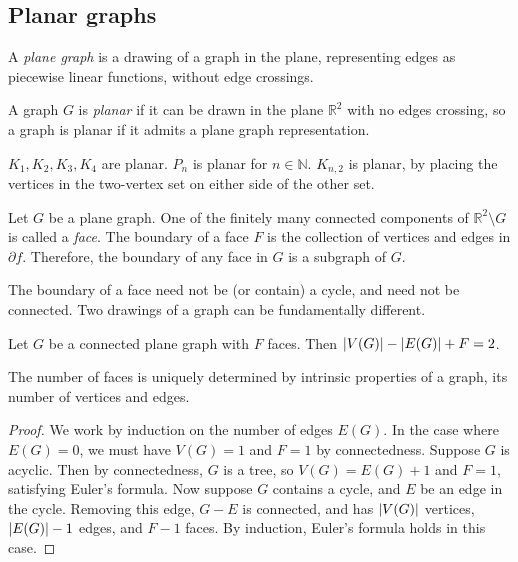 \subsection{Planar graphs}
\begin{definition}
	A \emph{plane graph} is a drawing of a graph in the plane, representing edges as piecewise linear functions, without edge crossings.
\end{definition}
\begin{definition}
	A graph \( G \) is \emph{planar} if it can be drawn in the plane \( \mathbb R^2 \) with no edges crossing, so a graph is planar if it admits a plane graph representation.
\end{definition}
\begin{example}
	\( K_1, K_2, K_3, K_4 \) are planar.
	\( P_n \) is planar for \( n \in \mathbb N \).
	\( K_{n,2} \) is planar, by placing the vertices in the two-vertex set on either side of the other set.
\end{example}
\begin{definition}
	Let \( G \) be a plane graph.
	One of the finitely many connected components of \( \mathbb R^2 \setminus G \) is called a \emph{face}.
	The boundary of a face \( F \) is the collection of vertices and edges in \( \partial f \).
	Therefore, the boundary of any face in \( G \) is a subgraph of \( G \).
\end{definition}
\begin{remark}
	The boundary of a face need not be (or contain) a cycle, and need not be connected.
	Two drawings of a graph can be fundamentally different.
\end{remark}
\begin{theorem}[Euler]
	Let \( G \) be a connected plane graph with \( F \) faces.
	Then \( \abs{V(G)} - \abs{E(G)} + F = 2 \).
\end{theorem}
\begin{remark}
	The number of faces is uniquely determined by intrinsic properties of a graph, its number of vertices and edges.
\end{remark}
\begin{proof}
	We work by induction on the number of edges \( E(G) \).
	In the case where \( E(G) = 0 \), we must have \( V(G) = 1 \) and \( F = 1 \) by connectedness.
	Suppose \( G \) is acyclic.
	Then by connectedness, \( G \) is a tree, so \( V(G) = E(G) + 1 \) and \( F = 1 \), satisfying Euler's formula.
	Now suppose \( G \) contains a cycle, and \( E \) be an edge in the cycle.
	Removing this edge, \( G - E \) is connected, and has \( \abs{V(G)} \) vertices, \( \abs{E(G)} - 1 \) edges, and \( F - 1 \) faces.
	By induction, Euler's formula holds in this case.
\end{proof}
